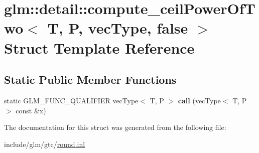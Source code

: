 \hypertarget{structglm_1_1detail_1_1compute__ceilPowerOfTwo_3_01T_00_01P_00_01vecType_00_01false_01_4}{}\section{glm\+:\+:detail\+:\+:compute\+\_\+ceil\+Power\+Of\+Two$<$ T, P, vec\+Type, false $>$ Struct Template Reference}
\label{structglm_1_1detail_1_1compute__ceilPowerOfTwo_3_01T_00_01P_00_01vecType_00_01false_01_4}
\subsection*{Static Public Member Functions}
\begin{DoxyCompactItemize}
\item 
\mbox{\label{structglm_1_1detail_1_1compute__ceilPowerOfTwo_3_01T_00_01P_00_01vecType_00_01false_01_4_a4b44424366238156e2a2d1b19ace1ad5}} 
static G\+L\+M\+\_\+\+F\+U\+N\+C\+\_\+\+Q\+U\+A\+L\+I\+F\+I\+ER vec\+Type$<$ T, P $>$ {\bfseries call} (vec\+Type$<$ T, P $>$ const \&x)
\end{DoxyCompactItemize}


The documentation for this struct was generated from the following file\+:\begin{DoxyCompactItemize}
\item 
include/glm/gtc/\hyperlink{round_8inl}{round.\+inl}\end{DoxyCompactItemize}
